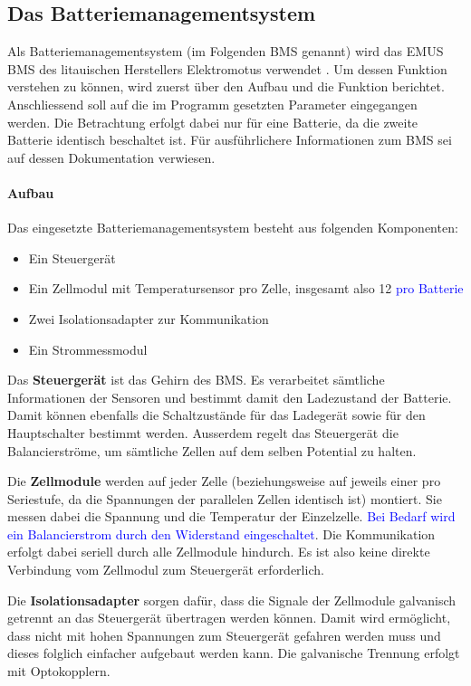 \subsection{Das Batteriemanagementsystem}

Als Batteriemanagementsystem (im Folgenden BMS genannt) wird das EMUS BMS des litauischen Herstellers Elektromotus verwendet \cite{emus}. Um dessen Funktion verstehen zu können, wird zuerst über den Aufbau und die Funktion berichtet. Anschliessend soll auf die im Programm gesetzten Parameter eingegangen werden. Die Betrachtung erfolgt dabei nur für eine Batterie, da die zweite Batterie identisch beschaltet ist. Für ausführlichere Informationen zum BMS sei auf dessen Dokumentation \cite{bms} verwiesen.

\paragraph{Aufbau}
Das eingesetzte Batteriemanagementsystem besteht aus folgenden Komponenten: \begin{itemize}
	\item Ein Steuergerät
	\item Ein Zellmodul mit Temperatursensor pro Zelle, insgesamt also 12 \textcolor{blue}{pro Batterie}
	\item Zwei Isolationsadapter zur Kommunikation
	\item Ein Strommessmodul
\end{itemize}

Das \textbf{Steuergerät} ist das Gehirn des BMS. Es verarbeitet sämtliche Informationen der Sensoren und bestimmt damit den Ladezustand der Batterie. Damit können ebenfalls die Schaltzustände für das Ladegerät sowie für den Hauptschalter bestimmt werden. Ausserdem regelt das Steuergerät die Balancierströme, um sämtliche Zellen auf dem selben Potential zu halten.

Die \textbf{Zellmodule} werden auf jeder Zelle (beziehungsweise auf jeweils einer pro Seriestufe, da die Spannungen der parallelen Zellen identisch ist) montiert. Sie messen dabei die Spannung und die Temperatur der Einzelzelle. \textcolor{blue}{Bei Bedarf wird ein Balancierstrom durch den Widerstand eingeschaltet}. Die Kommunikation erfolgt dabei seriell durch alle Zellmodule hindurch. Es ist also keine direkte Verbindung vom Zellmodul zum Steuergerät erforderlich.

Die \textbf{Isolationsadapter} sorgen dafür, dass die Signale der Zellmodule galvanisch getrennt an das Steuergerät übertragen werden können. Damit wird ermöglicht, dass nicht mit hohen Spannungen zum Steuergerät gefahren werden muss und dieses folglich einfacher aufgebaut werden kann. Die galvanische Trennung erfolgt mit Optokopplern.

